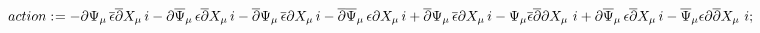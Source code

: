 \documentclass[11pt]{article}
\def\specialcolon{\mathrel{\mathop{:}}\hspace{-.5em}}
\renewcommand{\bar}[1]{\overline{#1}}
\begin{document}
\begin{dmath*}[compact, spread=2pt]
action\specialcolon{}=  - \partial{{\Psi}_{\mu}}\,  \bar{\epsilon} \bar{\partial}{{X}_{\mu}}\,  i - \partial{{\bar{\Psi}}_{\mu}}\,  \epsilon \bar{\partial}{{X}_{\mu}}\,  i - \bar{\partial}{{\Psi}_{\mu}}\,  \bar{\epsilon} \partial{{X}_{\mu}}\,  i - \bar{\partial}{{\bar{\Psi}}_{\mu}}\,  \epsilon \partial{{X}_{\mu}}\,  i + \bar{\partial}{{\Psi}_{\mu}}\,  \bar{\epsilon} \partial{{X}_{\mu}}\,  i - {\Psi}_{\mu} \bar{\epsilon} \bar{\partial}{\partial{{X}_{\mu}}\, }\,  i + \partial{{\bar{\Psi}}_{\mu}}\,  \epsilon \bar{\partial}{{X}_{\mu}}\,  i - {\bar{\Psi}}_{\mu} \epsilon \partial{\bar{\partial}{{X}_{\mu}}\, }\,  i;
\end{dmath*}
\end{document}
